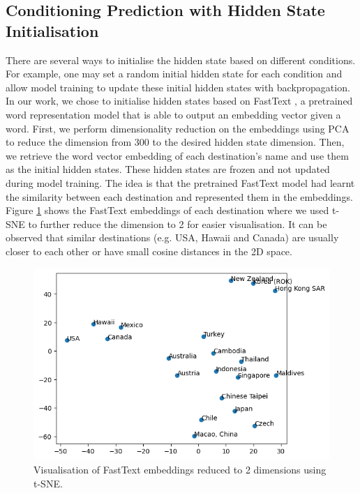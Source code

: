 \documentclass{article}
\begin{document}
\subsection{Conditioning Prediction with Hidden State Initialisation}
\label{appx:cond}
There are several ways to initialise the hidden state based on different conditions. For example, one may set a random initial hidden state for each condition and allow model training to update these initial hidden states with backpropagation. In our work, we chose to initialise hidden states based on FastText \cite{fasttext}, a pretrained word representation model that is able to output an embedding vector given a word. First, we perform dimensionality reduction on the embeddings using PCA to reduce the dimension from 300 to the desired hidden state dimension. Then, we retrieve the word vector embedding of each destination's name and use them as the initial hidden states. These hidden states are frozen and not updated during model training. The idea is that the pretrained FastText model had learnt the similarity between each destination and represented them in the embeddings. Figure \ref{fig:fasttext} shows the FastText embeddings of each destination where we used t-SNE \cite{tsne} to further reduce the dimension to 2 for easier visualisation. It can be observed that similar destinations (e.g. USA, Hawaii and Canada) are usually closer to each other or have small cosine distances in the 2D space.

\begin{figure}[htbp]
     \centering
     \includegraphics[width=.5\textwidth]{images/fasttext embeddings.png}
     \caption{Visualisation of FastText embeddings reduced to 2 dimensions using t-SNE.}
    \label{fig:fasttext}
\end{figure}
\end{document}
